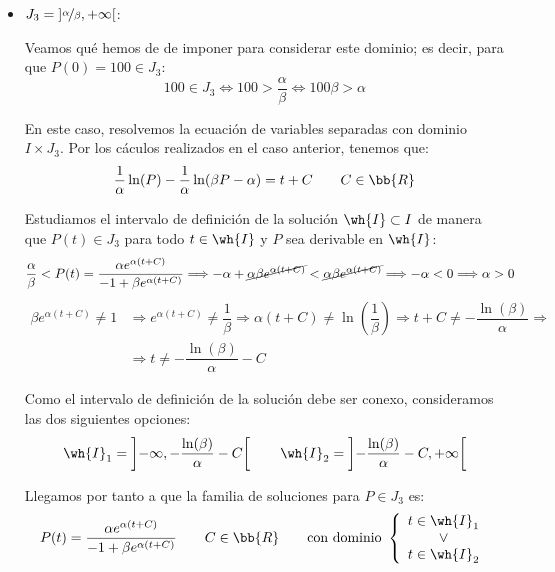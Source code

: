 \begin{ejercicio}
\begin{itemize}
        \item \ul{$J_3=\left]\nicefrac{\alpha}{\beta}, +\infty\right[$}:
        
        Veamos qué hemos de de imponer para considerar este dominio; es decir, para que $P(0)=100\in J_3$:
        \begin{equation*}
            100\in J_3 \Longleftrightarrow 100>\dfrac{\alpha}{\beta} \Longleftrightarrow 100\beta>\alpha
        \end{equation*}

        En este caso, resolvemos la ecuación de variables separadas con dominio $I\times J_3$.
        Por los cáculos realizados en el caso anterior, tenemos que:
        \begin{equation*}
            \dfrac{1}{\alpha} \ln(P) - \dfrac{1}{\alpha} \ln(\beta P - \alpha) = t + C \qquad C\in \bb{R}
        \end{equation*}

        Estudiamos el intervalo de definición de la solución $\wh{I}\subset I$ de manera que $P(t)\in J_3$ para todo $t\in \wh{I}$ y $P$ sea derivable en $\wh{I}$:
        \begin{align*}
            \frac{\alpha}{\beta}&<P(t)=\dfrac{\alpha e^{\alpha (t + C)}}{-1+\beta e^{\alpha (t + C)}}
            \Longrightarrow -\alpha + \cancel{\alpha\beta e^{\alpha(t+C)}} < \cancel{\alpha\beta e^{\alpha(t+C)}} \Longrightarrow -\alpha < 0 \Longrightarrow \alpha > 0
        \end{align*}
        \begin{align*}
            \beta e^{\alpha(t+C)}\neq 1 &\Longrightarrow e^{\alpha(t+C)}\neq \dfrac{1}{\beta} \Longrightarrow \alpha(t+C)\neq \ln\left(\dfrac{1}{\beta}\right) \Longrightarrow t+C\neq -\dfrac{\ln(\beta)}{\alpha} \Longrightarrow \\ &\Longrightarrow t\neq -\dfrac{\ln(\beta)}{\alpha} - C
        \end{align*}

        Como el intervalo de definición de la solución debe ser conexo, consideramos las dos siguientes opciones:
        \begin{equation*}
            \wh{I}_1 = \left]-\infty, -\dfrac{\ln(\beta)}{\alpha} - C\right[ \qquad \wh{I}_2 = \left]-\dfrac{\ln(\beta)}{\alpha} - C, +\infty\right[
        \end{equation*}

        Llegamos por tanto a que la familia de soluciones para $P\in J_3$ es:
        \begin{equation*}
            P(t) = \dfrac{\alpha e^{\alpha (t + C)}}{-1+\beta e^{\alpha (t + C)}} \qquad C\in \bb{R} \qquad \text{con dominio } \left\{\begin{array}{c}t\in \wh{I}_1 \\ \lor\\ t\in \wh{I}_2\end{array}\right.
        \end{equation*}


\end{itemize}
\end{ejercicio}
